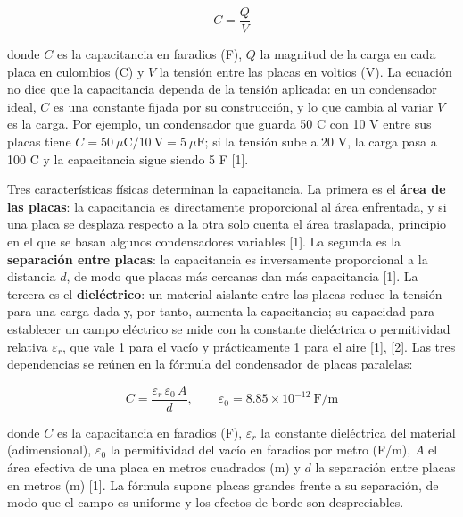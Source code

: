 \documentclass[11pt,letterpaper]{article}
\begin{document}
\begin{equation}
  C = \frac{Q}{V}
\end{equation}

donde $C$ es la capacitancia en faradios (F), $Q$ la magnitud de la carga en cada placa en culombios (C) y $V$ la tensión entre las placas en voltios (V). La ecuación no dice que la capacitancia dependa de la tensión aplicada: en un condensador ideal, $C$ es una constante fijada por su construcción, y lo que cambia al variar $V$ es la carga. Por ejemplo, un condensador que guarda 50 \textmu{}C con 10 V entre sus placas tiene $C = 50\ \mu\text{C} / 10\ \text{V} = 5\ \mu\text{F}$; si la tensión sube a 20 V, la carga pasa a 100 \textmu{}C y la capacitancia sigue siendo 5 \textmu{}F [1].

Tres características físicas determinan la capacitancia. La primera es el \textbf{área de las placas}: la capacitancia es directamente proporcional al área enfrentada, y si una placa se desplaza respecto a la otra solo cuenta el área traslapada, principio en el que se basan algunos condensadores variables [1]. La segunda es la \textbf{separación entre placas}: la capacitancia es inversamente proporcional a la distancia $d$, de modo que placas más cercanas dan más capacitancia [1]. La tercera es el \textbf{dieléctrico}: un material aislante entre las placas reduce la tensión para una carga dada y, por tanto, aumenta la capacitancia; su capacidad para establecer un campo eléctrico se mide con la constante dieléctrica o permitividad relativa $\varepsilon_r$, que vale 1 para el vacío y prácticamente 1 para el aire [1], [2]. Las tres dependencias se reúnen en la fórmula del condensador de placas paralelas:

\begin{equation}
  C = \frac{\varepsilon_r \, \varepsilon_0 \, A}{d}, \qquad \varepsilon_0 = 8.85 \times 10^{-12}\ \text{F/m}
\end{equation}

donde $C$ es la capacitancia en faradios (F), $\varepsilon_r$ la constante dieléctrica del material (adimensional), $\varepsilon_0$ la permitividad del vacío en faradios por metro (F/m), $A$ el área efectiva de una placa en metros cuadrados (m\texttwosuperior{}) y $d$ la separación entre placas en metros (m) [1]. La fórmula supone placas grandes frente a su separación, de modo que el campo es uniforme y los efectos de borde son despreciables.
\end{document}
